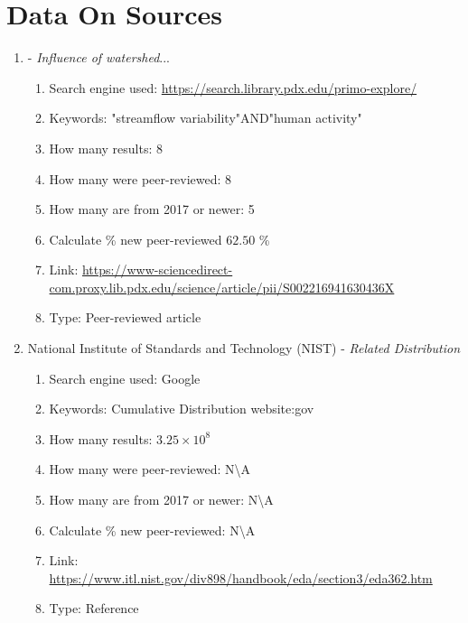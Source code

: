 \documentclass[a4paper,man,biblatex]{apa7}
\begin{document}
\printbibliography

\appendix
\section{Data On Sources}
\label{appendix:data_on_source}

\begin{enumerate}

    \item \textcite{rice_2016} - \textit{Influence of watershed}...
        \begin{enumerate}
            \item Search engine used: \url{https://search.library.pdx.edu/primo-explore/}
            \item Keywords: "streamflow variability"AND"human activity"
            \item How many results: 8 
            \item How many were peer-reviewed: 8
            \item How many are from 2017 or newer: 5
            \item Calculate \% new peer-reviewed $62.50$  \%
            \item Link: \url{https://www-sciencedirect-com.proxy.lib.pdx.edu/science/article/pii/S002216941630436X}
            \item Type: Peer-reviewed article
        \end{enumerate}

    \item National Institute of Standards and Technology (NIST) - \textit{Related Distribution}
        \begin{enumerate}
            \item Search engine used: Google
            \item Keywords: Cumulative Distribution website:gov
            \item How many results: $3.25\times 10^8$
            \item How many were peer-reviewed:  N\textbackslash A
            \item How many are from 2017 or newer: N\textbackslash A
            \item Calculate \% new peer-reviewed: N\textbackslash A 
            \item Link: \url{https://www.itl.nist.gov/div898/handbook/eda/section3/eda362.htm}
            \item Type: Reference 
        \end{enumerate}


\end{enumerate}
\end{document}
